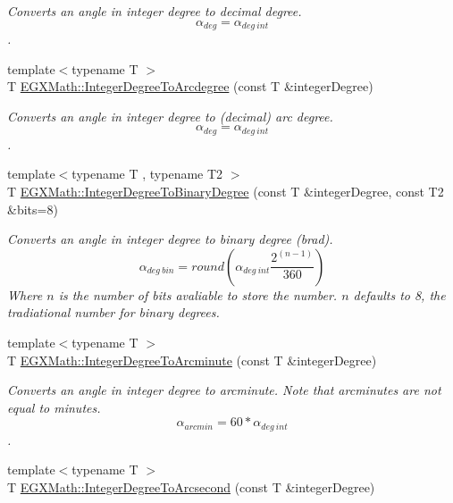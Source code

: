 \begin{DoxyCompactItemize}
\begin{DoxyCompactList}\small\item\em Converts an angle in integer degree to decimal degree. \[\alpha_{deg}=\alpha_{deg\ int}\]. \end{DoxyCompactList}\item 
{\footnotesize template$<$typename T $>$ }\\T \mbox{\hyperlink{group___e_g_x_math-_angle_conversions-_integer_degree_gaf633d0b82bfb7586ce86ffbcf78d8f7a}{E\+G\+X\+Math\+::\+Integer\+Degree\+To\+Arcdegree}} (const T \&integer\+Degree)
\begin{DoxyCompactList}\small\item\em Converts an angle in integer degree to (decimal) arc degree. \[\alpha_{deg}=\alpha_{deg\ int}\]. \end{DoxyCompactList}\item 
{\footnotesize template$<$typename T , typename T2 $>$ }\\T \mbox{\hyperlink{group___e_g_x_math-_angle_conversions-_integer_degree_ga694bbfe624c3c14e97ce6155ca9bc44d}{E\+G\+X\+Math\+::\+Integer\+Degree\+To\+Binary\+Degree}} (const T \&integer\+Degree, const T2 \&bits=8)
\begin{DoxyCompactList}\small\item\em Converts an angle in integer degree to binary degree (brad). \[\alpha_{deg\ bin}=round(\alpha_{deg\ int}\frac{2^{(n-1)}}{360})\] Where $n$ is the number of bits avaliable to store the number. $n$ defaults to 8, the tradiational number for binary degrees. \end{DoxyCompactList}\item 
{\footnotesize template$<$typename T $>$ }\\T \mbox{\hyperlink{group___e_g_x_math-_angle_conversions-_integer_degree_ga78b014e7649d666a3647c467e64e4fe8}{E\+G\+X\+Math\+::\+Integer\+Degree\+To\+Arcminute}} (const T \&integer\+Degree)
\begin{DoxyCompactList}\small\item\em Converts an angle in integer degree to arcminute. Note that arcminutes are not equal to minutes. \[\alpha_{arcmin}= 60 * \alpha_{deg\ int}\]. \end{DoxyCompactList}\item 
{\footnotesize template$<$typename T $>$ }\\T \mbox{\hyperlink{group___e_g_x_math-_angle_conversions-_integer_degree_gaa04058a2fea3dc3678264a05fac6e1ae}{E\+G\+X\+Math\+::\+Integer\+Degree\+To\+Arcsecond}} (const T \&integer\+Degree)

\end{DoxyCompactItemize}
